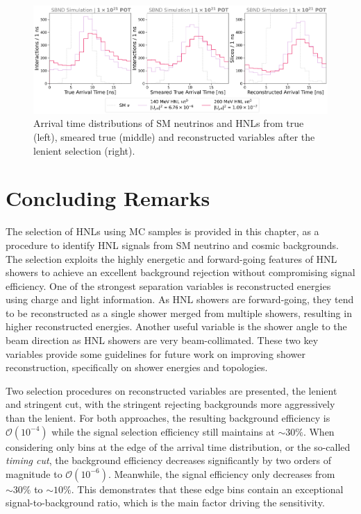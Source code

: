 \begin{figure}[ht!]
    \centering
    \includegraphics[width=\textwidth]{truth_smear_zoom.png}
    \caption[Arrival Time of SM Neutrinos and HNLs with an Improved Timing Resolution]{Arrival time distributions of SM neutrinos and HNLs from true (left), smeared true (middle) and reconstructed variables after the lenient selection (right).}
    \label{fig:hnl_sm_smear}
\end{figure}


\section{Concluding Remarks}
\label{sec:select_conclude}

The selection of HNLs using MC samples is provided in this chapter, as a procedure to identify HNL signals from SM neutrino and cosmic backgrounds.
The selection exploits the highly energetic and forward-going features of HNL showers to achieve an excellent background rejection without compromising signal efficiency.
One of the strongest separation variables is reconstructed energies using charge and light information.
As HNL showers are forward-going, they tend to be reconstructed as a single shower merged from multiple showers, resulting in higher reconstructed energies.
Another useful variable is the shower angle to the beam direction as HNL showers are very beam-collimated.
These two key variables provide some guidelines for future work on improving shower reconstruction, specifically on shower energies and topologies.

Two selection procedures on reconstructed variables are presented, the lenient and stringent cut, with the stringent rejecting backgrounds more aggressively than the lenient.
For both approaches, the resulting background efficiency is $\mathcal{O}(10^{-4})$ while the signal selection efficiency still maintains at $\sim30\%$. 
When considering only bins at the edge of the arrival time distribution, or the so-called \textit{timing cut}, the background efficiency decreases significantly by two orders of magnitude to $\mathcal{O}(10^{-6})$.
Meanwhile, the signal efficiency only decreases from $\sim30\%$ to $\sim10\%$. 
This demonstrates that these edge bins contain an exceptional signal-to-background ratio, which is the main factor driving the sensitivity.

